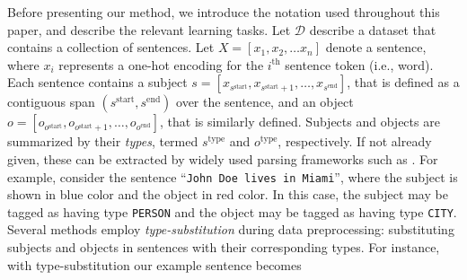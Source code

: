 

Before presenting our method, we introduce the notation used throughout this paper, and describe the relevant learning tasks.
Let $\mathcal{D}$ describe a dataset that contains a collection of sentences.
Let $X=[x_1, x_2, \ldots x_n]$ denote a sentence, where $x_i$ represents a one-hot encoding for the $i^{\text{th}}$ sentence token (i.e., word).
Each sentence contains a subject $s = [x_{s^{\textrm{start}}}, x_{s^{\textrm{start}} + 1}, \hdots, x_{s^{\textrm{end}}}]$, that is defined as a contiguous span $(s^{\textrm{start}}, s^{\textrm{end}})$ over the sentence, and an object $o = [o_{o^{\textrm{start}}}, o_{o^{\textrm{start}} + 1}, \hdots, o_{o^{\textrm{end}}}]$, that is similarly defined.
Subjects and objects are summarized by their {\em types}, termed $s^{\textrm{type}}$ and $o^{\textrm{type}}$, respectively.
If not already given, these can be extracted by widely used parsing frameworks such as \citep{stanfordcorenlp}.
For example, consider the sentence ``\texttt{\textcolor{our_blue}{John Doe} lives in \textcolor{our_red}{Miami}}'', where the subject is shown in \textcolor{our_blue}{blue} color and the object in \textcolor{our_red}{red} color.
In this case, the subject may be tagged as having type \textcolor{our_blue}{\texttt{PERSON}} and the object may be tagged as having type \textcolor{our_red}{\texttt{CITY}}.
Several methods \citep[e.g.,][]{palstm, cgcn, aggcn} employ {\em type-substitution} during data preprocessing: substituting subjects and objects in sentences with their corresponding types.
For instance, with type-substitution our example sentence becomes
